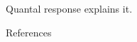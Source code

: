 
Quantal response \cite{mckelvey1995quantal} explains it.

\begin{frame}[allowframebreaks]{References}
  \footnotesize
  
  
\end{frame}

